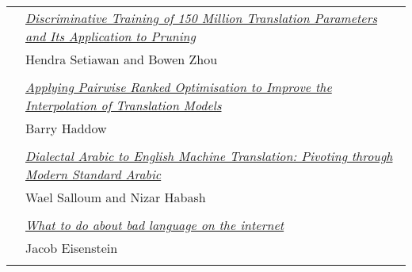 \begin{tabular}{p{20mm}p{138mm}}
 & \hyperlink{page.335}{\em Discriminative Training of 150 Million Translation Parameters and Its Application to Pruning}\\
         & Hendra Setiawan and Bowen Zhou \\
\\

 & \hyperlink{page.342}{\em Applying Pairwise Ranked Optimisation to Improve the Interpolation of Translation Models}\\
         & Barry Haddow \\
\\

 & \hyperlink{page.348}{\em Dialectal Arabic to English Machine Translation: Pivoting through Modern Standard Arabic}\\
         & Wael Salloum and Nizar Habash \\
\\

 & \hyperlink{page.359}{\em What to do about bad language on the internet}\\
         & Jacob Eisenstein \\
\\

\end{tabular}
\newpage
